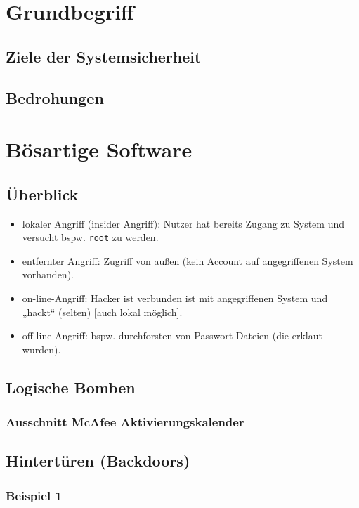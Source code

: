 
\section{Grundbegriff}
\subsection{Ziele der Systemsicherheit}
\subsection{Bedrohungen}

\section{Bösartige Software}
\subsection{Überblick}
\begin{itemize}
\item lokaler Angriff (insider Angriff): Nutzer hat bereits Zugang zu System und versucht bspw. \lstinline`root` zu werden.
\item entfernter Angriff: Zugriff von außen (kein Account auf angegriffenen System vorhanden).
\item on-line-Angriff: Hacker ist verbunden ist mit angegriffenen System und „hackt“ (selten) [auch lokal möglich].
\item off-line-Angriff: bspw. durchforsten von Passwort-Dateien (die erklaut wurden).
\end{itemize}

\subsection{Logische Bomben}
\subsubsection*{Ausschnitt McAfee Aktivierungskalender}

\subsection{Hintertüren (Backdoors)}
\subsubsection*{Beispiel 1}
